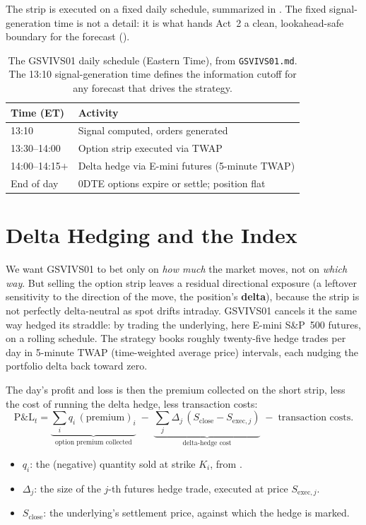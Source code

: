 The strip is executed on a fixed daily schedule, summarized in . The fixed signal-generation time is not a detail: it is what hands Act~2 a clean, lookahead-safe boundary for the forecast ().

\begin{table}[ht]
\centering
\caption{The GSVIVS01 daily schedule (Eastern Time), from \texttt{GSVIVS01.md}. The 13:10 signal-generation time defines the information cutoff for any forecast that drives the strategy.}
\label{tab:gsvivs:schedule}
\begin{tabular}{ll}
\toprule
Time (ET) & Activity \\
\midrule
13:10 & Signal computed, orders generated \\
13:30--14:00 & Option strip executed via TWAP \\
14:00--14:15$+$ & Delta hedge via E-mini futures (5-minute TWAP) \\
End of day & 0DTE options expire or settle; position flat \\
\bottomrule
\end{tabular}
\end{table}

\section{Delta Hedging and the Index}
\label{sec:gsvivs:hedge-index}

We want GSVIVS01 to bet only on \emph{how much} the market moves, not on \emph{which way}. But selling the option strip leaves a residual directional exposure (a leftover sensitivity to the direction of the move, the position's \textbf{delta}), because the strip is not perfectly delta-neutral as spot drifts intraday. GSVIVS01 cancels it the same way  hedged its straddle: by trading the underlying, here E-mini S\&P~500 futures, on a rolling schedule. The strategy books roughly twenty-five hedge trades per day in 5-minute TWAP (time-weighted average price) intervals, each nudging the portfolio delta back toward zero.

The day's profit and loss is then the premium collected on the short strip, less the cost of running the delta hedge, less transaction costs:
\begin{equation}
\label{eq:gsvivs:dailypnl}
\text{P\&L}_t = \underbrace{\sum_i q_i\,(\text{premium})_i}_{\text{option premium collected}} \;-\; \underbrace{\sum_j \Delta_j\,(S_{\text{close}} - S_{\text{exec},j})}_{\text{delta-hedge cost}} \;-\; \text{transaction costs}.
\end{equation}
\begin{itemize}
  \item $q_i$: the (negative) quantity sold at strike $K_i$, from .
  \item $\Delta_j$: the size of the $j$-th futures hedge trade, executed at price $S_{\text{exec},j}$.
  \item $S_{\text{close}}$: the underlying's settlement price, against which the hedge is marked.
\end{itemize}

